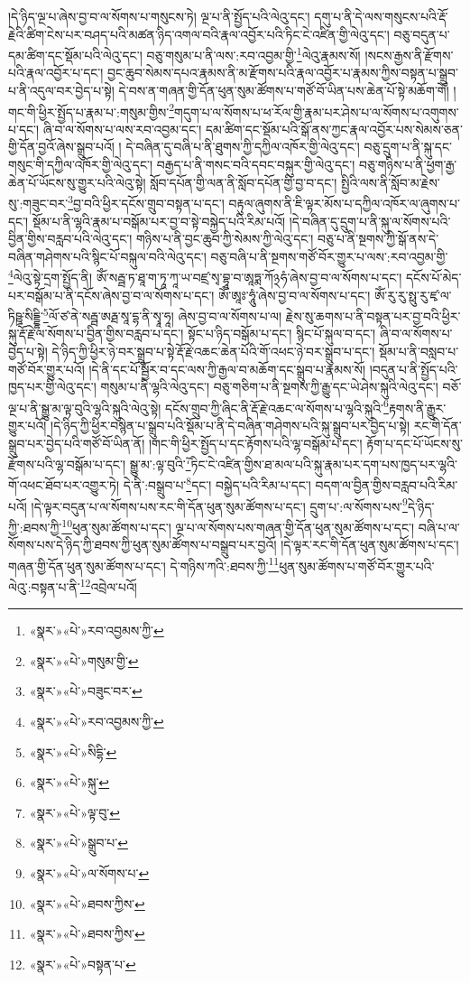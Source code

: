 །དེ་ཉིད་ལྔ་པ་ཞེས་བྱ་བ་ལ་སོགས་པ་གསུངས་ཏེ། ལྔ་པ་ནི་སྤྱོད་པའི་ལེའུ་དང་། དགུ་པ་ནི་དེ་ལས་གསུངས་པའི་རྡོ་རྗེའི་ཚིག་ངེས་པར་བཤད་པའི་མཚན་ཉིད་འགལ་བའི་རྣལ་འབྱོར་པའི་ཏིང་ངེ་འཛིན་གྱི་ལེའུ་དང་། བཅུ་བདུན་པ་དམ་ཚིག་དང་སྡོམ་པའི་ལེའུ་དང་། བཅུ་གསུམ་པ་ནི་ལས་:རབ་འབྱམ་གྱི་\footnote{«སྣར་»«པེ་»རབ་འབྱམས་ཀྱི་}ལེའུ་རྣམས་སོ། །སངས་རྒྱས་ནི་རྫོགས་པའི་རྣལ་འབྱོར་པ་དང་། བྱང་ཆུབ་སེམས་དཔའ་རྣམས་ནི་མ་རྫོགས་པའི་རྣལ་འབྱོར་པ་རྣམས་ཀྱིས་བསྟན་པ་སྒྲུབ་པ་ནི་འདུལ་བར་བྱེད་པ་སྟེ། དེ་བས་ན་གཞན་གྱི་དོན་ཕུན་སུམ་ཚོགས་པ་གཙོ་བོ་ཡིན་པས་ཆེན་པོ་སྟེ་མཆོག་གོ། །གང་གི་ཕྱིར་སྤྱོད་པ་རྣམ་པ་:གསུམ་གྱིས་\footnote{«སྣར་»«པེ་»གསུམ་གྱི་}གདུག་པ་ལ་སོགས་པ་ཕ་རོལ་གྱི་རྣམ་པར་ཤེས་པ་ལ་སོགས་པ་འགུགས་པ་དང་། ཞི་བ་ལ་སོགས་པ་ལས་རབ་འབྱམ་དང་། དམ་ཚིག་དང་སྡོམ་པའི་སྒོ་ནས་ཀྱང་རྣལ་འབྱོར་པས་སེམས་ཅན་གྱི་དོན་བྱའོ་ཞེས་སྒྲུབ་པའོ། །
དེ་བཞིན་དུ་བཞི་པ་ནི་ཐུགས་ཀྱི་དཀྱིལ་འཁོར་གྱི་ལེའུ་དང་། བཅུ་དྲུག་པ་ནི་སྐུ་དང་གསུང་གི་དཀྱིལ་འཁོར་གྱི་ལེའུ་དང་། བརྒྱད་པ་ནི་གསང་བའི་དབང་བསྐུར་གྱི་ལེའུ་དང་། བཅུ་གཉིས་པ་ནི་ཕྱག་རྒྱ་ཆེན་པོ་ཡོངས་སུ་གྱུར་པའི་ལེའུ་སྟེ། སློབ་དཔོན་གྱི་ལན་ནི་སློབ་དཔོན་གྱི་བྱ་བ་དང་། སྤྱིའི་ལས་ནི་སློབ་མ་རྗེས་སུ་:གཟུང་བར་\footnote{«སྣར་»«པེ་»བཟུང་བར་}བྱ་བའི་ཕྱིར་དངོས་གྲུབ་བསྟན་པ་དང་། བརྟུལ་ཞུགས་ནི་ཇི་ལྟར་མོས་པ་དཀྱིལ་འཁོར་ལ་ཞུགས་པ་དང་། སྡོམ་པ་ནི་ལྷའི་རྣམ་པ་བསྒོམ་པར་བྱ་བ་སྟེ་བསྐྱེད་པའི་རིམ་པའོ། །དེ་བཞིན་དུ་དྲུག་པ་ནི་སྐུ་ལ་སོགས་པའི་བྱིན་གྱིས་བརླབ་པའི་ལེའུ་དང་། གཉིས་པ་ནི་བྱང་ཆུབ་ཀྱི་སེམས་ཀྱི་ལེའུ་དང་། བཅུ་པ་ནི་སྔགས་ཀྱི་སྒོ་ནས་དེ་བཞིན་གཤེགས་པའི་སྙིང་པོ་བསྐུལ་བའི་ལེའུ་དང་། བཅུ་བཞི་པ་ནི་སྔགས་གཙོ་བོར་གྱུར་པ་ལས་:རབ་འབྱམ་གྱི་\footnote{«སྣར་»«པེ་»རབ་འབྱམས་ཀྱི་}ལེའུ་སྟེ་དྲག་སྤྱོད་ནི། ཨོཾ་སརྦྦ་ཏ་ཐཱ་ག་ཏཱ་ཀཱ་ཡ་བཛྲ་སྭ་བྷཱ་བ་ཨཱཏྨ་ཀོ྅ཧཾ་ཞེས་བྱ་བ་ལ་སོགས་པ་དང་། དངོས་པོ་མེད་པར་བསྒོམ་པ་ནི་དངོས་ཞེས་བྱ་བ་ལ་སོགས་པ་དང་། ཨོཾ་ཨཱཿ་ཧཱུཾ་ཞེས་བྱ་བ་ལ་སོགས་པ་དང་། ཨོཾ་རུ་རུ་སྥུ་རུ་ཛྭ་ལ་ཏིཥྛ་སིདྡྷི་\footnote{«སྣར་»«པེ་»སིདྷི་}ལོ་ཙ་ནེ་སརྦྦ་ཨརྠ་སཱ་དྷ་ནི་སྭཱ་ཧཱ། ཞེས་བྱ་བ་ལ་སོགས་པ་ལ། རྗེས་སུ་ཆགས་པ་ནི་བསྟན་པར་བྱ་བའི་ཕྱིར་སྐུ་རྡོ་རྗེ་ལ་སོགས་པ་བྱིན་གྱིས་བརླབ་པ་དང་། སྟོང་པ་ཉིད་བསྒོམ་པ་དང་། སྙིང་པོ་སྐུལ་བ་དང་། ཞི་བ་ལ་སོགས་པ་བྱེད་པ་སྟེ། དེ་ཉིད་ཀྱི་ཕྱིར་ཉེ་བར་སྒྲུབ་པ་སྟེ་རྡོ་རྗེ་འཆང་ཆེན་པོའི་གོ་འཕང་ཉེ་བར་སྒྲུབ་པ་དང་། སྡོམ་པ་ནི་བསླབ་པ་གཙོ་བོར་གྱུར་པའོ། །དེ་ནི་དང་པོ་སྦྱོར་བ་དང་ལས་ཀྱི་རྒྱལ་བ་མཆོག་དང་སྒྲུབ་པ་རྣམས་སོ། །བདུན་པ་ནི་སྤྱོད་པའི་ཁྱད་པར་གྱི་ལེའུ་དང་། གསུམ་པ་ནི་ལྷའི་ལེའུ་དང་། བཅུ་གཅིག་པ་ནི་སྔགས་ཀྱི་རྒྱུ་དང་ཡེ་ཤེས་སྐུའི་ལེའུ་དང་། བཅོ་ལྔ་པ་ནི་སྒྱུ་མ་ལྟ་བུའི་ལྷའི་སྐུའི་ལེའུ་སྟེ། དངོས་གྲུབ་ཀྱི་ཞིང་ནི་རྡོ་རྗེ་འཆང་ལ་སོགས་པ་ལྷའི་སྐུའི་\footnote{«སྣར་»«པེ་»སྐུ་}རྟགས་ནི་རྒྱུར་གྱུར་པའོ། །དེ་ཉིད་ཀྱི་ཕྱིར་བསྙེན་པ་སྒྲུབ་པའི་སྡོམ་པ་ནི་དེ་བཞིན་གཤེགས་པའི་སྐུ་སྒྲུབ་པར་བྱེད་པ་སྟེ། རང་གི་དོན་སྒྲུབ་པར་བྱེད་པའི་གཙོ་བོ་ཡིན་ནོ། །གང་གི་ཕྱིར་སྤྱོད་པ་དང་རྟོགས་པའི་ལྷ་བསྒོམ་པ་དང་། རྟོག་པ་དང་པོ་ཡོངས་སུ་རྫོགས་པའི་ལྷ་བསྒོམ་པ་དང་། སྒྱུ་མ་:ལྟ་བུའི་\footnote{«སྣར་»«པེ་»ལྟ་བུ་}ཏིང་ངེ་འཛིན་གྱིས་ཐ་མལ་པའི་སྐུ་རྣམ་པར་དག་པས་ཁྱད་པར་ལྷའི་གོ་འཕང་ཐོབ་པར་འགྱུར་ཏེ། དེ་ནི་:བསྒྲུབ་པ་\footnote{«སྣར་»«པེ་»སྒྲུབ་པ་}དང་། བསྐྱེད་པའི་རིམ་པ་དང་། བདག་ལ་བྱིན་གྱིས་བརླབ་པའི་རིམ་པའོ། །དེ་ལྟར་བདུན་པ་ལ་སོགས་པས་རང་གི་དོན་ཕུན་སུམ་ཚོགས་པ་དང་། དྲུག་པ་:ལ་སོགས་པས་\footnote{«སྣར་»«པེ་»ལ་སོགས་པ་}དེ་ཉིད་ཀྱི་:ཐབས་ཀྱི་\footnote{«སྣར་»«པེ་»ཐབས་ཀྱིས་}ཕུན་སུམ་ཚོགས་པ་དང་། ལྔ་པ་ལ་སོགས་པས་གཞན་གྱི་དོན་ཕུན་སུམ་ཚོགས་པ་དང་། བཞི་པ་ལ་སོགས་པས་དེ་ཉིད་ཀྱི་ཐབས་ཀྱི་ཕུན་སུམ་ཚོགས་པ་བསྒྲུབ་པར་བྱའོ། །དེ་ལྟར་རང་གི་དོན་ཕུན་སུམ་ཚོགས་པ་དང་། གཞན་གྱི་དོན་ཕུན་སུམ་ཚོགས་པ་དང་། དེ་གཉིས་ཀའི་:ཐབས་ཀྱི་\footnote{«སྣར་»«པེ་»ཐབས་ཀྱིས་}ཕུན་སུམ་ཚོགས་པ་གཙོ་བོར་གྱུར་པའི་ལེའུ་:བསྟན་པ་ནི་\footnote{«སྣར་»«པེ་»བསྟན་པ་}འབྲེལ་པའོ། 